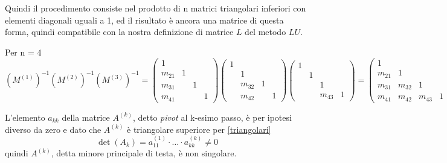 Quindi il procedimento consiste nel prodotto di n matrici triangolari
inferiori con elementi diagonali uguali a 1, ed il risultato \`e ancora
una matrice di questa forma, quindi compatibile con la nostra
definizione di matrice $L$ del metodo $LU$.

\begin{example}
Per n = 4
$$ (M^{(1)})^{-1} (M^{(2)})^{-1}(M^{(3)})^{-1} = 
\begin{pmatrix}
  1      &        &        & \\
  m_{21} & 1      &        & \\
  m_{31} &        & 1      & \\
  m_{41} &        &        & 1
\end{pmatrix}
\begin{pmatrix}
  1      &        &        & \\
         & 1      &        & \\
         & m_{32} & 1      & \\
         & m_{42} &        & 1
\end{pmatrix}
\begin{pmatrix}
  1      &        &        & \\
         & 1      &        & \\
         &        & 1      & \\
         &        & m_{43} & 1
\end{pmatrix} =
\begin{pmatrix}
  1      &        &        & \\
  m_{21} & 1      &        & \\
  m_{31} & m_{32} & 1      & \\
  m_{41} & m_{42} & m_{43} & 1
\end{pmatrix} = L
$$
\end{example}

L'elemento $a_{kk}$ della matrice $A^{(k)}$, detto \emph{pivot} al
k-esimo passo, \`e per ipotesi diverso da zero e dato che $A^{(k)}$ \`e
triangolare superiore per \ref{triangolari}
$$ \det(A_k) = a^{(1)}_{11} \cdot \ldots \cdot a^{(k)}_{kk} \neq 0 $$
quindi $A^{(k)}$, detta minore principale di testa, \`e non singolare.


